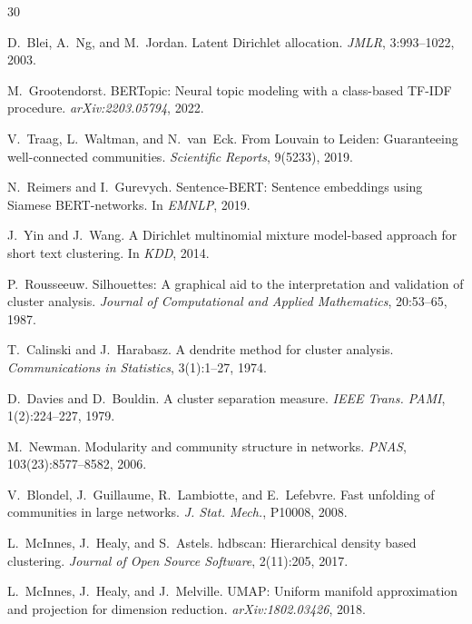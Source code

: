 \documentclass[10pt,twocolumn,twoside]{ctexart}
\begin{document}
\begin{thebibliography}{30}

D.~Blei, A.~Ng, and M.~Jordan.
Latent Dirichlet allocation.
\textit{JMLR}, 3:993--1022, 2003.

M.~Grootendorst.
BERTopic: Neural topic modeling with a class-based TF-IDF procedure.
\textit{arXiv:2203.05794}, 2022.

V.~Traag, L.~Waltman, and N.~van~Eck.
From Louvain to Leiden: Guaranteeing well-connected communities.
\textit{Scientific Reports}, 9(5233), 2019.

N.~Reimers and I.~Gurevych.
Sentence-BERT: Sentence embeddings using Siamese BERT-networks.
In \textit{EMNLP}, 2019.

J.~Yin and J.~Wang.
A Dirichlet multinomial mixture model-based approach for short text clustering.
In \textit{KDD}, 2014.

P.~Rousseeuw.
Silhouettes: A graphical aid to the interpretation and validation of cluster analysis.
\textit{Journal of Computational and Applied Mathematics}, 20:53--65, 1987.

T.~Calinski and J.~Harabasz.
A dendrite method for cluster analysis.
\textit{Communications in Statistics}, 3(1):1--27, 1974.

D.~Davies and D.~Bouldin.
A cluster separation measure.
\textit{IEEE Trans. PAMI}, 1(2):224--227, 1979.

M.~Newman.
Modularity and community structure in networks.
\textit{PNAS}, 103(23):8577--8582, 2006.

V.~Blondel, J.~Guillaume, R.~Lambiotte, and E.~Lefebvre.
Fast unfolding of communities in large networks.
\textit{J. Stat. Mech.}, P10008, 2008.

L.~McInnes, J.~Healy, and S.~Astels.
hdbscan: Hierarchical density based clustering.
\textit{Journal of Open Source Software}, 2(11):205, 2017.

L.~McInnes, J.~Healy, and J.~Melville.
UMAP: Uniform manifold approximation and projection for dimension reduction.
\textit{arXiv:1802.03426}, 2018.


\end{thebibliography}
\end{document}
